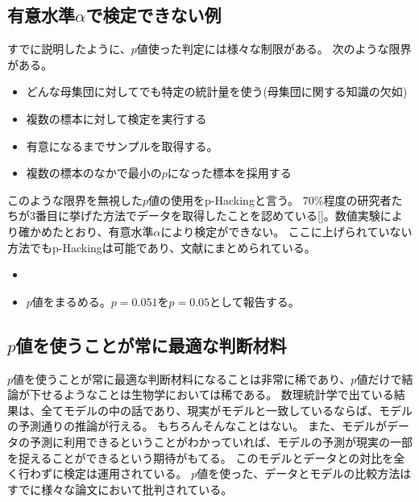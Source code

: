 \subsection{有意水準$\alpha$で検定できない例}
すでに説明したように、$p$値使った判定には様々な制限がある。
次のような限界がある。

\begin{itemize}
  \item どんな母集団に対してでも特定の統計量を使う(母集団に関する知識の欠如)
  \item 複数の標本に対して検定を実行する
  \item 有意になるまでサンプルを取得する。
  \item 複数の標本のなかで最小の$p$になった標本を採用する
\end{itemize}

このような限界を無視した$p$値の使用をp-Hackingと言う。
$70\%$程度の研究者たちが3番目に挙げた方法でデータを取得したことを認めている[\cite{john2012measuring}]。数値実験により確かめたとおり、有意水準$\alpha$により検定ができない。
ここに上げられていない方法でもp-Hackingは可能であり、文献\cite{stefan2023big}にまとめられている。
\begin{itemize}
  \item 
  \item $p$値をまるめる。$p=0.051$を$p=0.05$として報告する。
\end{itemize}
\fi
\subsection{$p$値を使うことが常に最適な判断材料}
$p$値を使うことが常に最適な判断材料になることは非常に稀であり、$p$値だけで結論が下せるようなことは生物学においては稀である。
数理統計学で出ている結果は、全てモデルの中の話であり、現実がモデルと一致しているならば、モデルの予測通りの推論が行える。
もちろんそんなことはない。
また、モデルがデータの予測に利用できるということがわかっていれば、モデルの予測が現実の一部を捉えることができるという期待がもてる。
このモデルとデータとの対比を全く行わずに検定は運用されている。
$p$値を使った、データとモデルの比較方法はすでに様々な論文において批判されている\cite{points_of_significance}。

